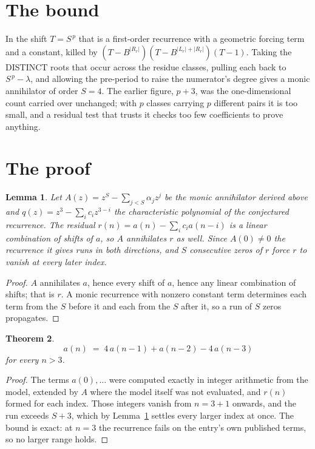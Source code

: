 \documentclass[11pt,a4paper]{article}
\theoremstyle{plain}
\newtheorem{theorem}{Theorem}
\newtheorem{lemma}[theorem]{Lemma}
\theoremstyle{definition}
\begin{document}
\section{The bound}

In the shift $T=S^{\,p}$ that is a first-order recurrence with a geometric forcing term and a
constant, killed by $(T-B^{|R_r|})(T-B^{|L_r|+|R_r|})(T-1)$. Taking the DISTINCT roots that
occur across the residue classes, pulling each back to $S^{\,p}-\lambda$, and allowing the
pre-period to raise the numerator's degree gives a monic annihilator of order $S=4$. The
earlier figure, $p+3$, was the one-dimensional count carried over unchanged; with $p$ classes
carrying $p$ different pairs it is too small, and a residual test that trusts it checks too few
coefficients to prove anything.

\section{The proof}

\begin{lemma}\label{lem:crit}
Let $A(z)=z^S-\sum_{j<S}\alpha_jz^{j}$ be the monic annihilator derived above and
$q(z)=z^{3}-\sum_ic_iz^{3-i}$ the characteristic polynomial of the conjectured
recurrence. The residual $r(n)=a(n)-\sum_ic_ia(n-i)$ is a linear combination of shifts of $a$,
so $A$ annihilates $r$ as well. Since $A(0)\ne0$ the recurrence it gives runs in both
directions, and $S$ consecutive zeros of $r$ force $r$ to vanish at every later index.
\end{lemma}

\begin{proof}
$A$ annihilates $a$, hence every shift of $a$, hence any linear combination of shifts; that is
$r$. A monic recurrence with nonzero constant term determines each term from the $S$ before it
and each from the $S$ after it, so a run of $S$ zeros propagates.
\end{proof}

\begin{theorem}
\[
a(n)\;=\;4\,a(n-1) + a(n-2) - 4\,a(n-3)
\]
for every $n>3$.
\end{theorem}

\begin{proof}
The terms $a(0),\dots$ were computed exactly in integer arithmetic from the model, extended by
$A$ where the model itself was not evaluated, and $r(n)$ formed for each index. Those integers
vanish from $n=3+1$ onwards, and the run exceeds $S+3$, which by
Lemma~\ref{lem:crit} settles every larger index at once. The bound is exact: at $n=3$ the recurrence fails on the entry's own published terms, so no larger range holds.
\end{proof}
\end{document}
